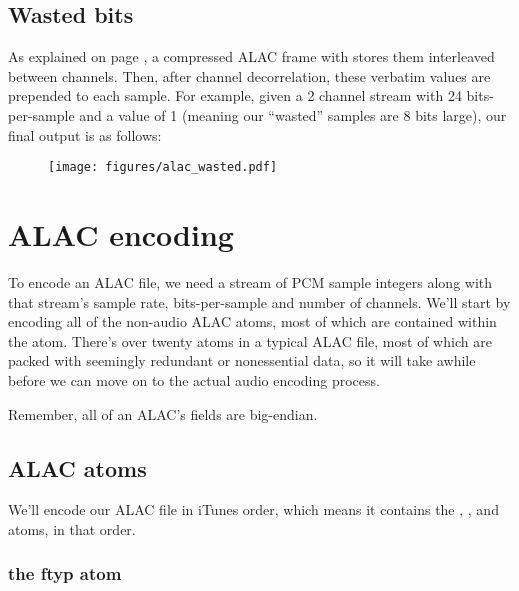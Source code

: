 \subsection{Wasted bits}

As explained on page \pageref{alac_wasted_bits}, a compressed ALAC frame
with  stores them interleaved between channels.
Then, after channel decorrelation, these verbatim values are
prepended to each sample.
For example, given a 2 channel stream with 24 bits-per-sample and
a  value of 1 (meaning our ``wasted'' samples
are 8 bits large), our final output is as follows:
\begin{figure}[h]
\texttt{[image: figures/alac\_wasted.pdf]}
\end{figure}

\clearpage

\section{ALAC encoding}

To encode an ALAC file, we need a stream of PCM sample integers
along with that stream's sample rate, bits-per-sample and number of
channels.
We'll start by encoding all of the non-audio ALAC atoms,
most of which are contained within the  atom.
There's over twenty atoms in a typical ALAC file,
most of which are packed with seemingly redundant or
nonessential data,
so it will take awhile before we can move on to the actual
audio encoding process.

Remember, all of an ALAC's fields are big-endian.

\subsection{ALAC atoms}

We'll encode our ALAC file in iTunes order, which means
it contains the , ,  and
 atoms, in that order.

\subsubsection{the ftyp atom}


